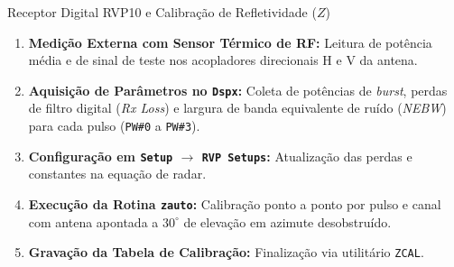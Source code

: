 ﻿\documentclass[aspectratio=169]{beamer}
\begin{document}
\begin{frame}{Receptor Digital RVP10 e Calibra{\c{c}}{\~a}o de Refletividade ($Z$)}
    \begin{enumerate}
        \item \textbf{Medi{\c{c}}{\~a}o Externa com Sensor T{\'e}rmico de RF:}
        Leitura de pot{\^e}ncia m{\'e}dia e de sinal de teste nos acopladores direcionais H e V da antena.
        \item \textbf{Aquisi{\c{c}}{\~a}o de Par{\^a}metros no \texttt{Dspx}:}
        Coleta de pot{\^e}ncias de \textit{burst}, perdas de filtro digital (\textit{Rx Loss}) e largura de banda equivalente de ru{\'i}do (\textit{NEBW}) para cada pulso (\texttt{PW\#0} a \texttt{PW\#3}).
        \item \textbf{Configura{\c{c}}{\~a}o em \texttt{Setup} $\to$ \texttt{RVP Setups}:}
        Atualiza{\c{c}}{\~a}o das perdas e constantes na equa{\c{c}}{\~a}o de radar.
        \item \textbf{Execu{\c{c}}{\~a}o da Rotina \texttt{zauto}:}
        Calibra{\c{c}}{\~a}o ponto a ponto por pulso e canal com antena apontada a $30^\circ$ de eleva{\c{c}}{\~a}o em azimute desobstru{\'i}do.
        \item \textbf{Grava{\c{c}}{\~a}o da Tabela de Calibra{\c{c}}{\~a}o:}
        Finaliza{\c{c}}{\~a}o via utilit{\'a}rio \texttt{ZCAL}.
    \end{enumerate}
\end{frame}
\end{document}
